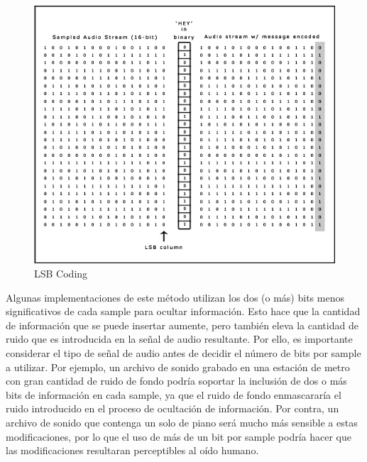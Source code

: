 \documentclass[12pt]{article}
\begin{document}
\begin{figure}
  \centering
    \includegraphics[width=\textwidth]{img/lsbimage}
  \caption{LSB Coding}
  \label{lsbcoding}
\end{figure}

Algunas implementaciones de este método utilizan los dos (o más) bits menos significativos de cada sample para ocultar información. Esto hace que la cantidad de información que se puede insertar aumente, pero también eleva la cantidad de ruido que es introducida en la señal de audio resultante. Por ello, es importante considerar el tipo de señal de audio antes de decidir el número de bits por sample a utilizar. Por ejemplo, un archivo de sonido grabado en una estación de metro con gran cantidad de ruido de fondo podría soportar la inclusión de dos o más bits de información en cada sample, ya que el ruido de fondo enmascararía el ruido introducido en el proceso de ocultación de información. Por contra, un archivo de sonido que contenga un solo de piano será mucho más sensible a estas modificaciones, por lo que el uso de más de un bit por sample podría hacer que las modificaciones resultaran perceptibles al oído humano.
\end{document}
